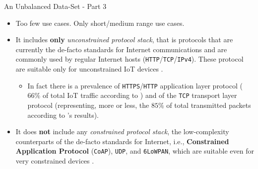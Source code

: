 \documentclass[10pt]{beamer}
\begin{document}
\begin{frame}{An Unbalanced Data-Set - Part 3}

\begin{itemize}
\justifying
\item Too few use cases. Only short/medium range use cases.

\item It includes \textbf{only} \textit{unconstrained protocol stack}, that is protocols that are currently the de-facto standards for Internet communications and are commonly used by regular Internet hosts (\texttt{HTTP}/\texttt{TCP}/\texttt{IPv4}). These protocol are suitable only for unconstrained IoT devices \cite{IOTCITY}.

\begin{itemize}
\justifying
\item In fact there is a prevalence of \texttt{HTTPS}/\texttt{HTTP} application layer protocol ($66\%$ of total IoT traffic according to \citet{ITPAReport}) and of the \texttt{TCP} transport layer protocol (representing, more or less, the $85\%$ of total transmitted packets according to \citet{ITPAReport}'s results).
\end{itemize}

\item It does \textbf{not} include any \textit{constrained protocol stack}, the low-complexity counterparts of the de-facto standards for Internet, i.e., \textbf{Constrained Application Protocol} (\texttt{CoAP}), \texttt{UDP}, and \texttt{6LoWPAN}, which are suitable even for very constrained devices \cite{IOTCITY}.

\end{itemize}

\end{frame} 
\end{document}
